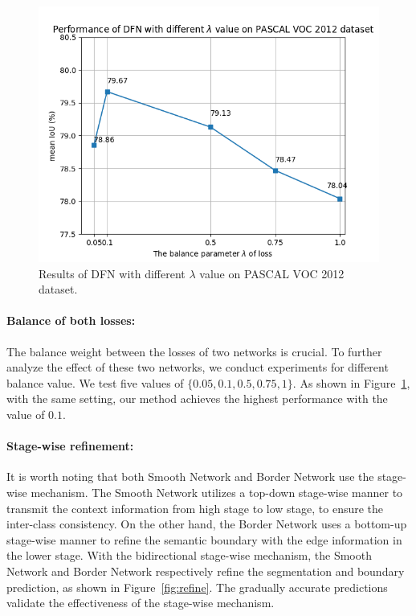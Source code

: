 \documentclass[10pt,twocolumn,letterpaper]{article}
\begin{document}
\begin{figure}[t]
\centering
\includegraphics[width=\linewidth]{lambda.png}
\caption{Results of DFN with different $\lambda$ value on PASCAL VOC 2012 dataset.}
\label{fig:lambda}
\end{figure}

\vspace{-2ex}    
\paragraph{Balance of both losses:} The balance weight between the losses of two networks is crucial. To further analyze the effect of these two networks, we conduct experiments for different balance value. We test five values of $\{0.05, 0.1, 0.5, 0.75, 1\}$. As shown in Figure~\ref{fig:lambda}, with the same setting, our method achieves the highest performance with the value of $0.1$. 

\vspace{-2ex}    
\paragraph{Stage-wise refinement:}
It is worth noting that both Smooth Network and Border Network use the stage-wise mechanism. The Smooth Network utilizes a top-down stage-wise manner to transmit the context information from high stage to low stage, to ensure the inter-class consistency. On the other hand, the Border Network uses a bottom-up stage-wise manner to refine the semantic boundary with the edge information in the lower stage. With the bidirectional stage-wise mechanism, the Smooth Network and Border Network respectively refine the segmentation and boundary prediction, as shown in Figure~\ref{fig:refine}. The gradually accurate predictions validate the effectiveness of the stage-wise mechanism. 
\end{document}
